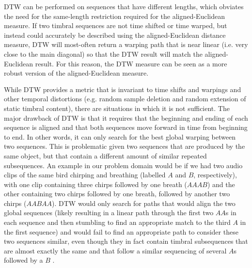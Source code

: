 \documentclass[a4paper,12pt]{report} 	%
\numberwithin{figure}{chapter}
\numberwithin{table}{chapter}
\numberwithin{equation}{chapter}
\begin{document}
\begin{flushleft}
DTW can be performed on sequences that have different lengths, which obviates the need for the same-length restriction required for the aligned-Euclidean measure. If two timbral sequences are not time shifted or time warped, but instead could accurately be described using the aligned-Euclidean distance measure, DTW will most-often return a warping path that is near linear (i.e. very close to the main diagonal) so that the DTW result will match the aligned-Euclidean result. For this reason, the DTW measure can be seen as a more robust version of the aligned-Euclidean measure.

While DTW provides a metric that is invariant to time shifts and warpings and other temporal distortions (e.g. random sample deletion and random extension of static timbral content), there are situations in which it is not sufficient. The major drawback of DTW is that it requires that the beginning and ending of each sequence is aligned and that both sequences move forward in time from beginning to end. In other words, it can only search for the best global warping between two sequences. This is problematic given two sequences that are produced by the same object, but that contain a different amount of similar repeated subsequences. An example in our problem domain would be if we had two audio clips of the same bird chirping and breathing (labelled $A$ and $B$, respectively), with one clip containing three chirps followed by one breath ($AAAB$) and the other containing two chirps followed by one breath, followed by another two chirps ($AABAA$). DTW would only search for paths that would align the two global sequences (likely resulting in a linear path through the first two $AA$s in each sequence and then stumbling to find an appropriate match to the third $A$ in the first sequence) and would fail to find an appropriate path to consider these two sequences similar, even though they in fact contain timbral subsequences that are almost exactly the same and that follow a similar sequencing of several $A$s followed by a $B$ \cite[p. 1143]{serra2008chroma}.


\end{flushleft}
\end{document}
